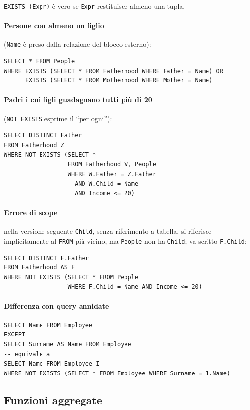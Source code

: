 \documentclass[a4paper,12pt]{article}
\begin{document}
\texttt{EXISTS (Expr)} è vero se \texttt{Expr} restituisce almeno una tupla.

\paragraph{Persone con almeno un figlio} (\texttt{Name} è preso dalla relazione
del blocco esterno):
\begin{verbatim}
SELECT * FROM People
WHERE EXISTS (SELECT * FROM Fatherhood WHERE Father = Name) OR
      EXISTS (SELECT * FROM Motherhood WHERE Mother = Name)
\end{verbatim}

\paragraph{Padri i cui figli guadagnano tutti più di 20} (\texttt{NOT EXISTS}
esprime il ``per ogni''):
\begin{verbatim}
SELECT DISTINCT Father
FROM Fatherhood Z
WHERE NOT EXISTS (SELECT *
                  FROM Fatherhood W, People
                  WHERE W.Father = Z.Father
                    AND W.Child = Name
                    AND Income <= 20)
\end{verbatim}

\paragraph{Errore di scope} nella versione seguente \texttt{Child}, senza
riferimento a tabella, si riferisce implicitamente al \texttt{FROM} più vicino,
ma \texttt{People} non ha \texttt{Child}; va scritto \texttt{F.Child}:
\begin{verbatim}
SELECT DISTINCT F.Father
FROM Fatherhood AS F
WHERE NOT EXISTS (SELECT * FROM People
                  WHERE F.Child = Name AND Income <= 20)
\end{verbatim}

\paragraph{Differenza con query annidate}
\begin{verbatim}
SELECT Name FROM Employee
EXCEPT
SELECT Surname AS Name FROM Employee
-- equivale a
SELECT Name FROM Employee I
WHERE NOT EXISTS (SELECT * FROM Employee WHERE Surname = I.Name)
\end{verbatim}

\subsection{Funzioni aggregate}
\end{document}
